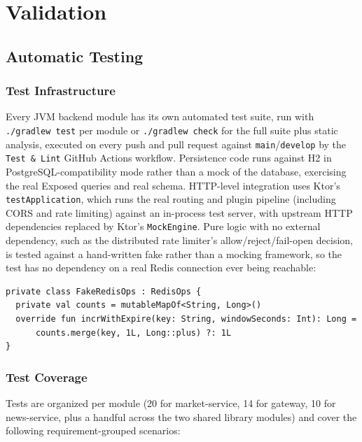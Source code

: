 \documentclass{scrartcl}
\begin{document}
\section{Validation}\label{validation}

\subsection{Automatic Testing}\label{automatic-testing}

\subsubsection{Test Infrastructure}\label{testing-infrastructure}

Every JVM backend module has its own automated test suite, run with \texttt{./gradlew test} per
module or \texttt{./gradlew check} for the full suite plus static analysis, executed on every
push and pull request against \texttt{main}/\texttt{develop} by the \texttt{Test \& Lint} GitHub
Actions workflow. Persistence code runs against H2 in PostgreSQL-compatibility mode rather than a
mock of the database, exercising the real Exposed queries and real schema. HTTP-level integration
uses Ktor's \texttt{testApplication}, which runs the real routing and plugin pipeline (including
CORS and rate limiting) against an in-process test server, with upstream HTTP dependencies
replaced by Ktor's \texttt{MockEngine}. Pure logic with no external dependency, such as the
distributed rate limiter's allow/reject/fail-open decision, is tested against a hand-written fake
rather than a mocking framework, so the test has no dependency on a real Redis connection ever
being reachable:

\begin{verbatim}
private class FakeRedisOps : RedisOps {
  private val counts = mutableMapOf<String, Long>()
  override fun incrWithExpire(key: String, windowSeconds: Int): Long =
      counts.merge(key, 1L, Long::plus) ?: 1L
}
\end{verbatim}

\subsubsection{Test Coverage}\label{testing-coverage}

Tests are organized per module (20 for market-service, 14 for gateway, 10 for news-service, plus
a handful across the two shared library modules) and cover the following requirement-grouped
scenarios:
\end{document}
